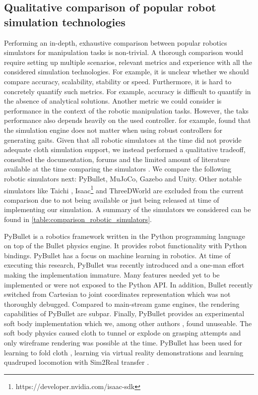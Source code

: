 \documentclass[\home/main.tex]{subfiles}
\begin{document}
\subsection{Qualitative comparison of popular robot simulation technologies}
Performing an in-depth, exhaustive comparison between popular robotics simulators for manipulation tasks is non-trivial. A thorough comparison would require setting up multiple scenarios, relevant metrics and experience with all the considered simulation technologies. For example, it is unclear whether we should compare accuracy, scalability, stability or speed. Furthermore, it is hard to concretely quantify such metrics. For example, accuracy is difficult to quantify in the absence of analytical solutions.
Another metric we could consider is performance in the context of the robotic manipulation tasks. However, the taks performance also depends heavily on the used controller. \textcite{Giovanni2011} for example, found that the simulation engine does not matter when using robust controllers for generating gaits.
Given that all robotic simulators at the time did not provide adequate cloth simulation support, we instead performed a qualitative tradeoff, consulted the documentation, forums and the limited amount of literature available at the time comparing the simulators \autocite{staranowicz2011survey,Erez2015}. We compare the following robotic simulators next: PyBullet, MuJoCo, Gazebo and Unity. Other notable simulators like Taichi \autocite{hu2019taichi}, Isaac\footnote{https://developer.nvidia.com/isaac-sdk} and ThreeDWorld \autocite{gan2021threedworld} are excluded from the current comparison due to not being available or just being released at time of implementing our simulation. A summary of the simulators we considered can be found in \cref{table:comparison_robotic_simulators}.

PyBullet is a robotics framework written in the Python programming language on top of the Bullet physics engine. It provides robot functionality with Python bindings. PyBullet has a focus on machine learning in robotics. At time of executing this research, PyBullet was recently introduced and a one-man effort making the implementation immature. Many features needed yet to be implemented or were not exposed to the Python API. In addition, Bullet recently switched from Cartesian to joint coordinates representation which was not thoroughly debugged. Compared to main-stream game engines, the rendering capabilities of PyBullet are subpar. Finally, PyBullet provides an experimental soft body implementation which we, among other authors \autocite{Matas2018, seita2021learning}, found unuseable. The soft body physics caused cloth to tunnel or explode on grasping attempts and only wireframe rendering was possible at the time. PyBullet has been used for learning to fold cloth \autocite{Matas2018}, learning via virtual reality demonstrations \autocite{mahjourian2019hierarchical} and learning quadruped locomotion with Sim2Real transfer \autocite{tan2018simtoreal}.
\end{document}
